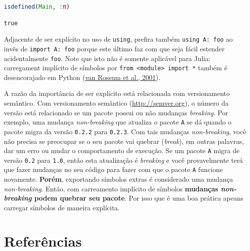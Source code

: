 \documentclass[
  notoc %
]{tufte-book}
\newcommand{\passthrough}[1]{#1}
\begin{document}
\begin{lstlisting}[language=Julia]
isdefined(Main, :π)
\end{lstlisting}

\begin{lstlisting}[language=Output]
true
\end{lstlisting}

Adjacente de ser explícito no uso de \passthrough{\lstinline!using!},
prefira também \passthrough{\lstinline!using A: foo!} ao invẽs de
\passthrough{\lstinline!import A: foo!} porque este último faz com que
seja fácil estender acidentalmente \passthrough{\lstinline!foo!}. Note
que isto não é somente aplicável para Julia: carregament implícito de
símbolos por \passthrough{\lstinline!from <module> import *!} também é
desencorajado em Python (\protect\hyperlink{ref-pep8}{van Rossum et al.,
2001}).

A razão da importância de ser explícito está relacionada com
versionamento semântico. Com versionamento semântico
(\url{http://semver.org}), o número da versão está relacionado se um
pacote possui ou não mudanças \emph{breaking}. Por exemplo, uma mudança
\emph{non-breaking} que atualiza o pacote \passthrough{\lstinline!A!} se
dá quando o pacote migra da versão \passthrough{\lstinline!0.2.2!} para
\passthrough{\lstinline!0.2.3!}. Com tais mudanças \emph{non-breaking},
você não precisa se preocupar se o seu pacote vai quebrar
(\emph{break}), em outras palavras, dar um erro ou mudar o comportamento
de execução. Se um pacote \passthrough{\lstinline!A!} migra de versão
\passthrough{\lstinline!0.2!} para \passthrough{\lstinline!1.0!}, então
esta atualização é \emph{breaking} e você provavelmente terá que fazer
mudanças no seu código para fazer com que o pacote
\passthrough{\lstinline!A!} funcione novamente. \textbf{Porém},
exportando símbolos extras é considerado uma mudança
\emph{non-breaking}. Então, com carreamento implícito de símbolos
\textbf{mudanças \emph{non-breaking} podem quebrar seu pacote}. Por isso
que é uma boa prática apeans carregar símbolos de maneira explícita.

\hypertarget{referuxeancias}{%
\chapter*{Referências}\label{referuxeancias}}
\end{document}
